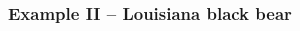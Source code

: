 \documentclass[color=usenames,dvipsnames]{beamer}
\begin{document}
\begin{frame}
  \frametitle{Example II -- Louisiana black bear}
  \begin{columns}
    \begin{column}{0.5\textwidth}
    \end{column}
    \begin{column}{0.5\textwidth}

\end{column}
\end{columns}
\end{frame}
\end{document}
